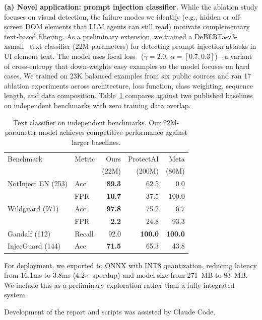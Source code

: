 \documentclass{article}
\begin{document}
\textbf{(a) Novel application: prompt injection classifier.} While the ablation study focuses on visual detection, the failure modes we identify (e.g., hidden or off-screen DOM elements that LLM agents can still read) motivate complementary text-based filtering. As a preliminary extension, we trained a DeBERTa-v3-xsmall~\cite{deberta} text classifier (22M parameters) for detecting prompt injection attacks in UI element text. The model uses focal loss~\cite{focalloss} ($\gamma=2.0$, $\alpha=[0.7,0.3]$)---a variant of cross-entropy that down-weights easy examples so the model focuses on hard cases. We trained on 23K balanced examples from six public sources and ran 17 ablation experiments across architecture, loss function, class weighting, sequence length, and data composition. Table~\ref{tab:classifier_benchmarks} compares against two published baselines on independent benchmarks with zero training data overlap.

\begin{table}[h]
\caption{Text classifier on independent benchmarks. Our 22M-parameter model achieves competitive performance against larger baselines.}
\label{tab:classifier_benchmarks}
\centering
\small
\begin{tabular}{llrrr}
\toprule
Benchmark & Metric & Ours & ProtectAI & Meta \\
 & & (22M) & (200M) & (86M) \\
\midrule
NotInject EN (253) & Acc & \textbf{89.3} & 62.5 & 0.0 \\
 & FPR & \textbf{10.7} & 37.5 & 100.0 \\
\midrule
Wildguard (971) & Acc & \textbf{97.8} & 75.2 & 6.7 \\
 & FPR & \textbf{2.2} & 24.8 & 93.3 \\
\midrule
Gandalf (112) & Recall & 92.0 & \textbf{100.0} & \textbf{100.0} \\
\midrule
InjecGuard (144) & Acc & \textbf{71.5} & 65.3 & 43.8 \\
\bottomrule
\end{tabular}
\end{table}

For deployment, we exported to ONNX with INT8 quantization, reducing latency from 16.1ms to 3.8ms (4.2$\times$ speedup) and model size from 271~MB to 83~MB. We include this as a preliminary exploration rather than a fully integrated system.

Development of the report and scripts was assisted by Claude Code.



\end{document}
